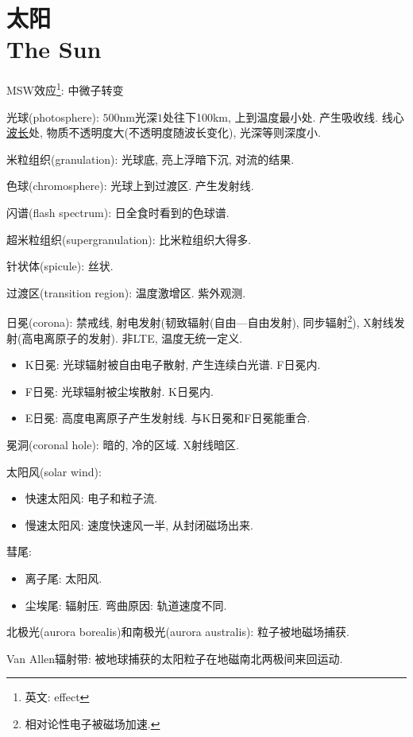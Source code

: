 \chapter{太阳\\The Sun}

MSW效应\footnote{英文: effect}: 中微子转变

光球(photosphere): $500\text{nm}$光深$1$处往下100km, 上到温度最小处. 产生吸收线. 线心\underline{波长}$\!\!$处, 物质不透明度大(不透明度随波长变化), 光深等则深度小.

米粒组织(granulation): 光球底, 亮上浮暗下沉, 对流的结果.

色球(chromosphere): 光球上到过渡区. 产生发射线.

闪谱(flash spectrum): 日全食时看到的色球谱.

超米粒组织(supergranulation): 比米粒组织大得多.

针状体(spicule): 丝状.

过渡区(transition region): 温度激增区. 紫外观测.

日冕(corona): 禁戒线, 射电发射(韧致辐射(自由---自由发射), 同步辐射\footnote{
    相对论性电子被磁场加速.
}), X射线发射(高电离原子的发射). 非LTE, 温度无统一定义.
\begin{itemize}
    \item K日冕: 光球辐射被自由电子散射, 产生连续白光谱. F日冕内.
    \item F日冕: 光球辐射被尘埃散射. K日冕内.
    \item E日冕: 高度电离原子产生发射线. 与K日冕和F日冕能重合.
\end{itemize}

冕洞(coronal hole): 暗的, 冷的区域. X射线暗区.

太阳风(solar wind):
\begin{itemize}
    \item 快速太阳风: 电子和粒子流.
    \item 慢速太阳风: 速度快速风一半, 从封闭磁场出来.
\end{itemize}

彗尾:
\begin{itemize}
    \item 离子尾: 太阳风.
    \item 尘埃尾: 辐射压. 弯曲原因: 轨道速度不同.
\end{itemize}

北极光(aurora borealis)和南极光(aurora australis): 粒子被地磁场捕获.

Van Allen辐射带: 被地球捕获的太阳粒子在地磁南北两极间来回运动.

